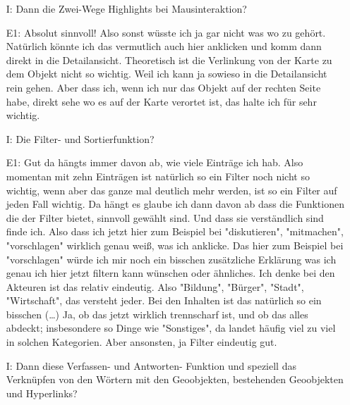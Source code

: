 \begin{itemize}
    \item[I:] Dann die Zwei-Wege Highlights bei Mausinteraktion?
    \item[E1:] Absolut sinnvoll! Also sonst w{\"u}sste ich ja gar nicht was wo zu geh{\"o}rt. Nat{\"u}rlich k{\"o}nnte ich das vermutlich auch hier anklicken und komm dann direkt in die Detailansicht. Theoretisch ist die Verlinkung von der Karte zu dem Objekt nicht so wichtig. Weil ich kann ja sowieso in die Detailansicht rein gehen. Aber dass ich, wenn ich nur das Objekt auf der rechten Seite habe, direkt sehe wo es auf der Karte verortet ist, das halte ich f{\"u}r sehr wichtig.
    \item[I:] Die Filter- und Sortierfunktion?
    \item[E1:] Gut da h{\"a}ngts immer davon ab, wie viele Eintr{\"a}ge ich hab. Also momentan mit zehn Eintr{\"a}gen ist nat{\"u}rlich so ein Filter noch nicht so wichtig, wenn aber das ganze mal deutlich mehr werden, ist so ein Filter auf jeden Fall wichtig. Da h{\"a}ngt es glaube ich dann davon ab dass die Funktionen die der Filter bietet, sinnvoll gew{\"a}hlt sind. Und dass sie verst{\"a}ndlich sind finde ich. Also dass ich jetzt hier zum Beispiel bei "diskutieren", "mitmachen", "vorschlagen" wirklich genau wei{\ss}, was ich anklicke. Das hier zum Beispiel bei "vorschlagen" w{\"u}rde ich mir noch ein bisschen zus{\"a}tzliche Erkl{\"a}rung was ich genau ich hier jetzt filtern kann w{\"u}nschen oder {\"a}hnliches. Ich denke bei den Akteuren ist das relativ eindeutig. Also "Bildung", "B{\"u}rger", "Stadt", "Wirtschaft", das versteht jeder. Bei den Inhalten ist das nat{\"u}rlich so ein bisschen (\dots) Ja, ob das jetzt wirklich trennscharf ist, und ob das alles abdeckt; insbesondere so Dinge wie "Sonstiges", da landet h{\"a}ufig viel zu viel in solchen Kategorien. Aber ansonsten, ja Filter eindeutig gut.
    \item[I:] Dann diese Verfassen- und Antworten- Funktion und speziell das Verkn{\"u}pfen von den W{\"o}rtern mit den Geoobjekten, bestehenden Geoobjekten und Hyperlinks?

\end{itemize}
